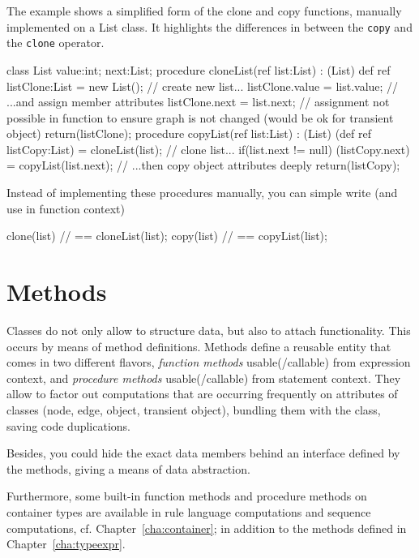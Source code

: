 \begin{example}
The example shows a simplified form of the clone and copy functions, manually implemented on a List class.
It highlights the differences in between the \texttt{copy} and the \texttt{clone} operator.
\begin{grgen}
class List {
  value:int;
  next:List;
}
procedure cloneList(ref list:List) : (List)
{
  def ref listClone:List = new List(); // create new list...
  listClone.value = list.value; // ...and assign member attributes
  listClone.next = list.next; // assignment not possible in function to ensure graph is not changed (would be ok for transient object)
  return(listClone);
}
procedure copyList(ref list:List) : (List)
{
  (def ref listCopy:List) = cloneList(list); // clone list...
  if(list.next != null) {
    (listCopy.next) = copyList(list.next); // ...then copy object attributes deeply
  } 
  return(listCopy);
}
\end{grgen}
Instead of implementing these procedures manually, you can simple write (and use in function context)
\begin{grgen}
clone(list) // == cloneList(list);
copy(list) // == copyList(list);
\end{grgen}
\end{example}

\section{Methods}\label{sec:objectoriented}

Classes do not only allow to structure data, but also to attach functionality.
This occurs by means of method definitions.
Methods define a reusable entity that comes in two different flavors, \emph{function methods} usable(/callable) from expression context, and \emph{procedure methods} usable(/callable) from statement context.
They allow to factor out computations that are occurring frequently on attributes of classes (node, edge, object, transient object), bundling them with the class, saving code duplications. 

Besides, you could hide the exact data members behind an interface defined by the methods, giving a means of data abstraction.

Furthermore, some built-in function methods and procedure methods on container types are available in rule language computations and sequence computations, cf. Chapter~\ref{cha:container};
in addition to the methods defined in Chapter~\ref{cha:typeexpr}.

